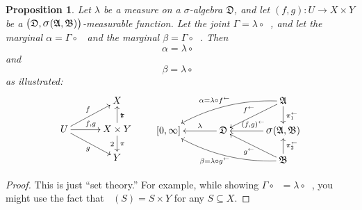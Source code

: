 \documentclass[
twoside=true,
paper=letter,
fontsize=9pt,
pagesize=auto,
leqno,
openany,
headsepline,
overfullrule,
]{scrbook}
\theoremstyle{plain}
\theoremstyle{plain}
\newtheorem{prop}[thm]{Proposition}
\theoremstyle{definition}
\theoremstyle{bfnoteitalic}
\theoremstyle{bfnoteroman}
\newcommand{\sigalg}[1]{\mathfrak{#1}}
\newcommand{\sagb}{\mathop{\hbox{\large{$\sigma$}}}\nolimits}
\newcommand{\textsigma}{\hbox{\large{$\sigma$}}\kern-1pt}
\newcommand{\preimage}[1]{\mathop{#1^{\leftarrow}}}
\newcommand{\sigmaalgebra}{\sigalg{A}}
\newcommand{\sigmaalgebraii}{\sigalg{B}}
\newcommand{\productsig}[2]{\sagb(#1,#2)}
\newcommand{\funcf}{f}
\newcommand{\funcg}{g}
\newcommand{\measurespace}{X}
\newcommand{\measurespaceii}{Y}
\newcommand{\measlambda}{\lambda}
\newcommand{\projectionone}{\pi_1}
\newcommand{\projectiontwo}{\pi_2}
\newcommand{\uspace}{U}%
\newcommand{\uspacesig}{\sigalg{D}}
\newcommand{\measonprod}{\Gamma}%
\newcommand{\marginalone}{\alpha}%
\newcommand{\marginaltwo}{\beta}%
\begin{document}
\begin{prop}\label{induced_marginals}
Let $\measlambda$ be a measure on a \textsigma-algebra
$\uspacesig$,
and let
$(\funcf,\funcg):\uspace\to \measurespace  \times \measurespaceii $
be a
$\bigl(\uspacesig,\productsig{\sigmaalgebra}{\sigmaalgebraii}\bigr)$\hyp{}measurable
function.
Let the joint
$\measonprod 
=
\measlambda\circ\preimage{(\funcf,\funcg)}$,
and let the marginal
$\marginalone
=
\measonprod\circ\preimage{\projectionone}$
and the marginal
$\marginaltwo
=
\measonprod\circ\preimage{\projectiontwo}$.
Then
\[
\marginalone
= 
\measlambda\circ\preimage{\funcf}
\]
and
\[
\marginaltwo
=
\measlambda\circ\preimage{\funcg}
\]
as illustrated:
\[
\xymatrix@R=16pt@C=30pt{ 
 & \measurespace
 \\
 \uspace 
 \ar[ur]^{\funcf}
 \ar[dr]_{\funcg}
 \ar[r]^{\funcf, \funcg} &
 \measurespace \times \measurespaceii  \ar[u]_\projectionone \ar[d]^\projectiontwo
 \\
 & \measurespaceii  \\
}
\qquad
\xymatrix@R=16pt@C=34pt{ 
 & & \sigmaalgebra
 \ar[dl]_{\preimage{\funcf}}
 \ar[d]^{\preimage{\projectionone}}
 \ar@/_10pt/[lld]_{\makebox[0pt][r]{$\scriptstyle{\marginalone} = $}\measlambda\circ\preimage{\funcf}}
 \\
 [0,\infty] & \uspacesig \ar[l]_-{\measlambda} & 
 \productsig{\sigmaalgebra}{\sigmaalgebraii} 
 \ar[l]_{\preimage{(\funcf,\funcg)}}
 \\
 & & \sigmaalgebraii
  \ar[u]_{\preimage{\projectiontwo}}
  \ar[ul]^{\preimage{\funcg}}
  \ar@/^10pt/[llu]^{\makebox[0pt][r]{$\scriptstyle{\marginaltwo} = $}\measlambda\circ\preimage{\funcg}}
  \\
}
\]
\end{prop}

\begin{proof}
This is just ``set theory.''  For example, while showing
$\measonprod \circ \preimage{\projectionone}
=
\measlambda\circ\preimage{\funcf}$,
you might use the fact that 
$\preimage{\projectionone}(S) = S\times \measurespaceii $ for any $S\subseteq \measurespace $.
\end{proof}
\end{document}
